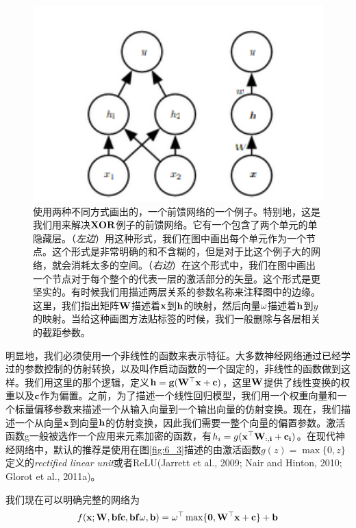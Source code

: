 \begin{figure}[htbp] %
   \centering
   \includegraphics[width=6in]{fig/chap6/6_2.png} 
   \centering
   \caption{使用两种不同方式画出的，一个前馈网络的一个例子。特别地，这是我们用来解决$\bf{XOR}$例子的前馈网络。它有一个包含了两个单元的单隐藏层。（\emph{左边}）用这种形式，我们在图中画出每个单元作为一个节点。这个形式是非常明确的和不含糊的，但是对于比这个例子大的网络，就会消耗太多的空间。（\emph{右边}）在这个形式中，我们在图中画出一个节点对于每个整个的代表一层的激活部分的矢量。这个形式是更坚实的。有时候我们用描述两层关系的参数名称来注释图中的边缘。这里，我们指出矩阵$\bf{W}$描述着$\bf{x}$到$\bf{h}$的映射，然后向量$\bf{\omega}$描述着$\bf{h}$到$y$的映射。当给这种画图方法贴标签的时候，我们一般删除与各层相关的截距参数。}
   \label{fig:6_2}
\end{figure}

明显地，我们必须使用一个非线性的函数来表示特征。大多数神经网络通过已经学过的参数控制的仿射转换，以及叫作启动函数的一个固定的，非线性的函数做到这样。我们用这里的那个逻辑，定义$\bf{h}=g(\bf{W}^\top \bf{x}+\bf{c})$，这里$\bf{W}$提供了线性变换的权重以及$\bf{c}$作为偏置。之前，为了描述一个线性回归模型，我们用一个权重向量和一个标量偏移参数来描述一个从输入向量到一个输出向量的仿射变换。现在，我们描述一个从向量$\bf{x}$到向量$\bf{h}$的仿射变换，因此我们需要一整个向量的偏置参数。激活函数g一般被选作一个应用来元素加密的函数，有$h_i=g(\bf{x}^\top \bf{W}_{:,i}+c_i)$。在现代神经网络中，默认的推荐是使用在图\ref{fig:6_3}描述的由激活函数$g(z)=\max\{0,z\}$定义的\emph{rectified linear unit}或者ReLU(Jarrett et al., 2009; Nair and Hinton, 2010; Glorot et al., 2011a)。


我们现在可以明确完整的网络为
\begin{equation}
f(\bf{x};\bf{W},bf{c},bf{\omega},\bf{b})=\bf{\omega}^\top \max\{0,\bf{W}^\top \bf{x}+\bf{c}\}+b
\end{equation}

